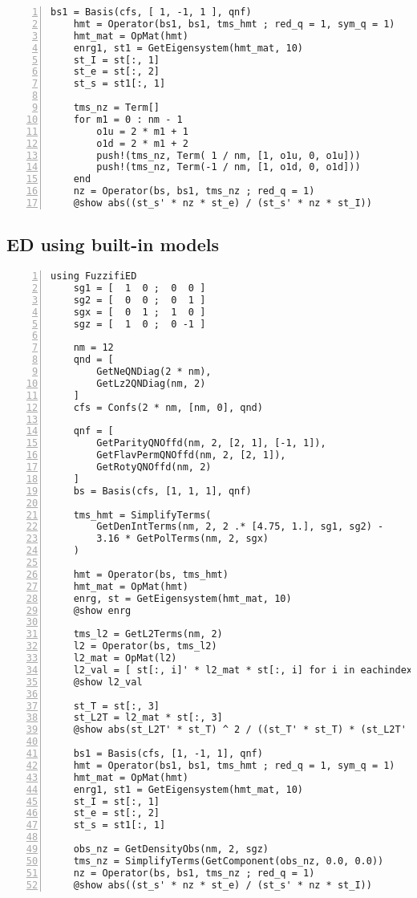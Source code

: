 \documentclass{timesjhep}
\begin{document}
\begin{lstlisting}[numbers=left]
    bs1 = Basis(cfs, [ 1, -1, 1 ], qnf) 
    hmt = Operator(bs1, bs1, tms_hmt ; red_q = 1, sym_q = 1) 
    hmt_mat = OpMat(hmt)
    enrg1, st1 = GetEigensystem(hmt_mat, 10)
    st_I = st[:, 1] 
    st_e = st[:, 2] 
    st_s = st1[:, 1]

    tms_nz = Term[]
    for m1 = 0 : nm - 1
        o1u = 2 * m1 + 1
        o1d = 2 * m1 + 2
        push!(tms_nz, Term( 1 / nm, [1, o1u, 0, o1u]))
        push!(tms_nz, Term(-1 / nm, [1, o1d, 0, o1d]))
    end
    nz = Operator(bs, bs1, tms_nz ; red_q = 1)
    @show abs((st_s' * nz * st_e) / (st_s' * nz * st_I))
\end{lstlisting}

\subsection{ED using built-in models}
\label{app:code_ed2}

\begin{lstlisting}[numbers=left]
    using FuzzifiED
    sg1 = [  1  0 ;  0  0 ]
    sg2 = [  0  0 ;  0  1 ]
    sgx = [  0  1 ;  1  0 ]
    sgz = [  1  0 ;  0 -1 ]

    nm = 12
    qnd = [ 
        GetNeQNDiag(2 * nm), 
        GetLz2QNDiag(nm, 2) 
    ]
    cfs = Confs(2 * nm, [nm, 0], qnd)

    qnf = [ 
        GetParityQNOffd(nm, 2, [2, 1], [-1, 1]), 
        GetFlavPermQNOffd(nm, 2, [2, 1]), 
        GetRotyQNOffd(nm, 2) 
    ]
    bs = Basis(cfs, [1, 1, 1], qnf)

    tms_hmt = SimplifyTerms(
        GetDenIntTerms(nm, 2, 2 .* [4.75, 1.], sg1, sg2) - 
        3.16 * GetPolTerms(nm, 2, sgx) 
    )

    hmt = Operator(bs, tms_hmt)
    hmt_mat = OpMat(hmt)
    enrg, st = GetEigensystem(hmt_mat, 10)
    @show enrg

    tms_l2 = GetL2Terms(nm, 2)
    l2 = Operator(bs, tms_l2)
    l2_mat = OpMat(l2)
    l2_val = [ st[:, i]' * l2_mat * st[:, i] for i in eachindex(enrg)]
    @show l2_val

    st_T = st[:, 3]
    st_L2T = l2_mat * st[:, 3]
    @show abs(st_L2T' * st_T) ^ 2 / ((st_T' * st_T) * (st_L2T' * st_L2T))

    bs1 = Basis(cfs, [1, -1, 1], qnf)
    hmt = Operator(bs1, bs1, tms_hmt ; red_q = 1, sym_q = 1) 
    hmt_mat = OpMat(hmt)
    enrg1, st1 = GetEigensystem(hmt_mat, 10)
    st_I = st[:, 1] 
    st_e = st[:, 2] 
    st_s = st1[:, 1]

    obs_nz = GetDensityObs(nm, 2, sgz)
    tms_nz = SimplifyTerms(GetComponent(obs_nz, 0.0, 0.0))
    nz = Operator(bs, bs1, tms_nz ; red_q = 1) 
    @show abs((st_s' * nz * st_e) / (st_s' * nz * st_I))
\end{lstlisting}
\end{document}
